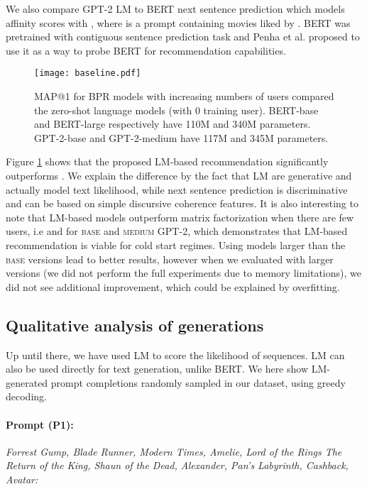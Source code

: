 \documentclass[runningheads]{llncs}
\begin{document}
We also compare GPT-2 LM to BERT next sentence prediction \cite{Penha20} which models affinity scores with , where  is a prompt containing movies liked by .
BERT was pretrained with contiguous sentence prediction task \cite{devlin-etal-2019-bert} and Penha et al. \cite{Penha20} proposed to use it as a way to probe BERT for recommendation capabilities.

\begin{figure}\centering
    \texttt{[image: baseline.pdf]}
    \caption{MAP@1 for BPR models with increasing numbers of users compared the zero-shot language models (with 0 training user). BERT-base and BERT-large respectively have 110M and 340M parameters. GPT-2-base and GPT-2-medium have 117M and 345M parameters. 
    }
    \label{baseline}
\end{figure}

Figure \ref{baseline} shows that the proposed LM-based recommendation significantly outperforms . We explain the difference by the fact that LM are generative and actually model text likelihood, while next sentence prediction is discriminative and can be based on simple discursive coherence features.
It is also interesting to note that LM-based models outperform matrix factorization when there are few users, i.e  and  for \textsc{base} and \textsc{medium} GPT-2, which demonstrates that LM-based recommendation is viable for cold start regimes. Using models larger than the \textsc{base} versions lead to better results, however when we evaluated with larger versions (we did not perform the full experiments due to memory limitations), we did not see additional improvement, which could be explained by overfitting.

\subsection{Qualitative analysis of generations}
 \vspace{-0.1cm}

Up until there, we have used LM to score the likelihood of sequences. LM can also be used directly for text generation, unlike BERT. We here show LM-generated prompt completions randomly sampled in our dataset, using greedy decoding.

\paragraph{\textbf{Prompt (P1):}}
\textit{Forrest Gump, Blade Runner, Modern Times, Amelie, Lord of the Rings The Return of the King, Shaun of the Dead, Alexander, Pan's Labyrinth, Cashback, Avatar:}
\vspace{-.3cm}
\end{document}
